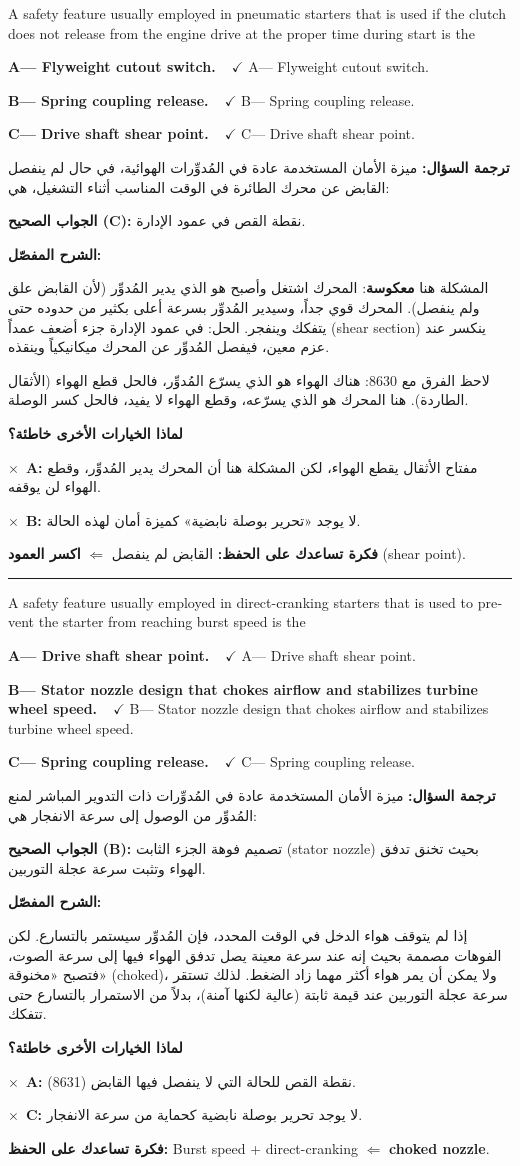 \documentclass[11pt,a4paper]{article}
\newcommand{\en}[1]{\textenglish{#1}}
\newcommand{\correctletter}{}
\newcommand{\opt}[2]{%
  \ifdefstring{\correctletter}{#1}%
    {\textcolor{ansgreen}{\textbf{#1— #2\ \ $\checkmark$}}}%
    {#1— #2}\par}
\newcommand{\Q}[6]{%
  \renewcommand{\correctletter}{#6}%
  \par\bigskip
  \phantomsection\label{q#1}%
  \begin{tcolorbox}[enhanced,breakable,colback=qback,colframe=qframe,
      arc=2mm,boxrule=0.8pt,fonttitle=\bfseries,
      title={\en{Question #1}}]
    \begin{english}
      #2\par\smallskip
      \opt{A}{#3}\opt{B}{#4}\opt{C}{#5}
    \end{english}
  \end{tcolorbox}}
\newcommand{\tr}[1]{\textbf{\textcolor{qframe}{ترجمة السؤال:}} #1\par}
\newcommand{\ans}[2]{%
  \begin{tcolorbox}[colback=ansback,colframe=ansgreen,boxrule=0.6pt,arc=1.5mm,
      left=4pt,right=4pt,top=2pt,bottom=2pt]
    \textbf{\textcolor{ansgreen}{الجواب الصحيح (\en{#1}):}} #2
  \end{tcolorbox}}
\newcommand{\sharh}[1]{\textbf{\textcolor{conceptc}{الشرح المفصّل:}}\par #1\par}
\newcommand{\nohead}{\textbf{\textcolor{wrongc}{لماذا الخيارات الأخرى خاطئة؟}}\par}
\newcommand{\no}[2]{\hspace*{1em}\textcolor{wrongc}{$\times$}\ \textbf{\en{#1}:} #2\par}
\newcommand{\tip}[1]{%
  \begin{tcolorbox}[colback=tipback,colframe=tipframe,boxrule=0.5pt,arc=1.5mm,
      left=4pt,right=4pt,top=2pt,bottom=2pt]
    \textbf{فكرة تساعدك على الحفظ:} #1
  \end{tcolorbox}}
\newcommand{\qsep}{\par\medskip\noindent\textcolor{qframe!40}{\rule{\linewidth}{0.4pt}}\par}
\begin{document}
\Q{8631}{A safety feature usually employed in pneumatic starters that is used if the clutch does not release from the engine drive at the proper time during start is the}
{Flyweight cutout switch.}
{Spring coupling release.}
{Drive shaft shear point.}{C}
\tr{ميزة الأمان المستخدمة عادة في المُدوِّرات الهوائية، في حال لم ينفصل القابض عن محرك الطائرة في الوقت المناسب أثناء التشغيل، هي:}
\ans{C}{نقطة القص في عمود الإدارة.}
\sharh{المشكلة هنا \textbf{معكوسة}: المحرك اشتغل وأصبح هو الذي يدير المُدوِّر (لأن القابض علق ولم ينفصل). المحرك قوي جداً، وسيدير المُدوِّر بسرعة أعلى بكثير من حدوده حتى يتفكك وينفجر. الحل: في عمود الإدارة جزء أضعف عمداً (\en{shear section}) ينكسر عند عزم معين، فيفصل المُدوِّر عن المحرك ميكانيكياً وينقذه.

لاحظ الفرق مع 8630: هناك الهواء هو الذي يسرّع المُدوِّر، فالحل قطع الهواء (الأثقال الطاردة). هنا المحرك هو الذي يسرّعه، وقطع الهواء لا يفيد، فالحل كسر الوصلة.}
\nohead
\no{A}{مفتاح الأثقال يقطع الهواء، لكن المشكلة هنا أن المحرك يدير المُدوِّر، وقطع الهواء لن يوقفه.}
\no{B}{لا يوجد «تحرير بوصلة نابضية» كميزة أمان لهذه الحالة.}
\tip{القابض لم ينفصل $\Leftarrow$ \textbf{اكسر العمود} (\en{shear point}).}
\qsep

\Q{8632}{A safety feature usually employed in direct-cranking starters that is used to prevent the starter from reaching burst speed is the}
{Drive shaft shear point.}
{Stator nozzle design that chokes airflow and stabilizes turbine wheel speed.}
{Spring coupling release.}{B}
\tr{ميزة الأمان المستخدمة عادة في المُدوِّرات ذات التدوير المباشر لمنع المُدوِّر من الوصول إلى سرعة الانفجار هي:}
\ans{B}{تصميم فوهة الجزء الثابت (\en{stator nozzle}) بحيث تخنق تدفق الهواء وتثبت سرعة عجلة التوربين.}
\sharh{إذا لم يتوقف هواء الدخل في الوقت المحدد، فإن المُدوِّر سيستمر بالتسارع. لكن الفوهات مصممة بحيث إنه عند سرعة معينة يصل تدفق الهواء فيها إلى سرعة الصوت، فتصبح «مخنوقة» (\en{choked})، ولا يمكن أن يمر هواء أكثر مهما زاد الضغط. لذلك تستقر سرعة عجلة التوربين عند قيمة ثابتة (عالية لكنها آمنة)، بدلاً من الاستمرار بالتسارع حتى تتفكك.}
\nohead
\no{A}{نقطة القص للحالة التي لا ينفصل فيها القابض (8631).}
\no{C}{لا يوجد تحرير بوصلة نابضية كحماية من سرعة الانفجار.}
\tip{\en{Burst speed} + \en{direct-cranking} $\Leftarrow$ \en{\textbf{choked nozzle}}.}

\newpage
\end{document}
